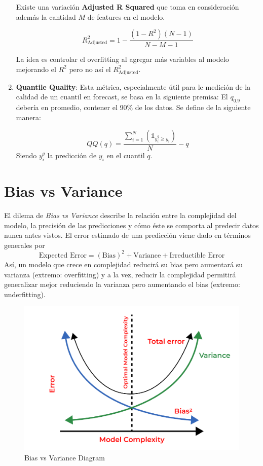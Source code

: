 \begin{enumerate}
    Existe una variación \textbf{Adjusted R Squared} que toma en consideración además la cantidad $M$ de features en el modelo. 

    $$
    R^2_{\text{Adjusted}} = 1 - \frac{(1-R^2)(N-1)}{N-M-1}
    $$

    La idea es controlar el overfitting al agregar más variables al modelo mejorando el $R^2$ pero no así el $R^2_{\text{Adjusted}}$.

    \item \textbf{Quantile Quality}: Esta métrica, especialmente útil para le medición de la calidad de un cuantil en forecast, se basa en la siguiente premisa: El $q_{0.9}$ debería en promedio, contener el 90\% de los datos. Se define de la siguiente manera: 

    $$
    QQ(q) = \frac{\sum_{i=1}^N (\mathds{1}_{y^{q}_i \geq y_i})}{N} - q
    $$
    Siendo $y^{q}_i$ la predicción de $y_i$ en el cuantil $q$. 
    
    
\end{enumerate}

\section{Bias vs Variance}

El dilema de \textit{Bias vs Variance} describe la relación entre la complejidad del modelo, la precisión de las predicciones y cómo éste se comporta al predecir datos nunca antes vistos. El error estimado de una predicción viene dado en términos generales por 
$$
\text{Expected Error} = (\text{Bias})^2 + \text{Variance} + \text{Irreductible Error}
$$
Así, un modelo que crece en complejidad reducirá su bias pero aumentará su varianza (extremo: overfitting) y a la vez, reducir la complejidad permitirá generalizar mejor reduciendo la varianza pero aumentando el bias (extremo: underfitting). 

\begin{figure}[H]
    \center
    \includegraphics[scale=0.27]{notebooks/Basic/img/bias_vs_variance.png}
    \caption{Bias vs Variance Diagram}
\end{figure}
